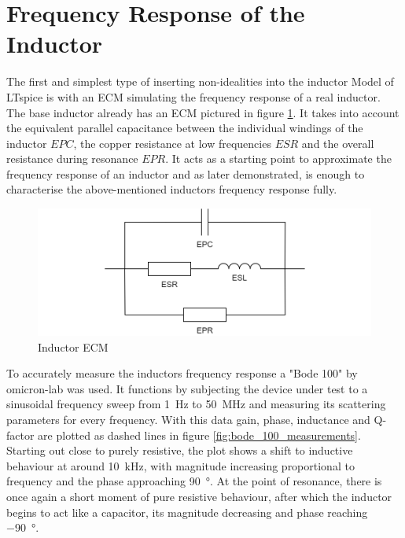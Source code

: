\section{Frequency Response of the Inductor} \label{sec:frequency_response_of_the_inductor}
The first and simplest type of inserting non-idealities into the inductor Model of LTspice is with an \ac{ECM} simulating the frequency response of a real inductor. The base inductor already has an \ac{ECM} pictured in figure \ref{fig:inductor_ecm}. It takes into account the equivalent parallel capacitance between the individual windings of the inductor $EPC$, the copper resistance at low frequencies $ESR$ and the overall resistance during resonance $EPR$. It acts as a starting point to approximate the frequency response of an inductor and as later demonstrated, is enough to characterise the above-mentioned inductors frequency response fully.
\begin{figure}[H]
    \centering
    \includegraphics[width=0.75\linewidth]{Bilder//Kapitel3/Inductor_ECM.png}
    \caption{Inductor \ac{ECM}}
    \label{fig:inductor_ecm}
\end{figure}
To accurately measure the inductors frequency response a "Bode 100" by omicron-lab was used. It functions by subjecting the device under test to a sinusoidal frequency sweep from \SI{1}{\Hz} to \SI{50}{\mega\Hz} and measuring its scattering parameters for every frequency. With this data gain, phase, inductance and \ac{Q-factor} are plotted as dashed lines in figure \ref{fig:bode_100_measurements}. Starting out close to purely resistive, the plot shows a shift to inductive behaviour at around \SI{10}{\kilo\Hz}, with magnitude increasing proportional to frequency and the phase approaching \SI{90}{\degree}. At the point of resonance, there is once again a short moment of pure resistive behaviour, after which the inductor begins to act like a capacitor, its magnitude decreasing and phase reaching \SI{-90}{\degree}.\\
